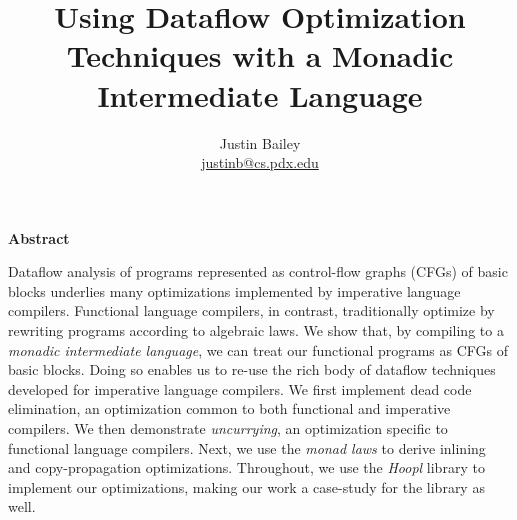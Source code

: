 \documentclass[12pt]{report}
\begin{document}


\newcommand{\authorEmail}{\url{justinb@cs.pdx.edu}}

\date{}
\author{Justin Bailey \\ \authorEmail}
\title{Using Dataflow Optimization Techniques with a Monadic Intermediate Language}
\maketitle 
\thispagestyle{empty}
\newpage
{}
\thispagestyle{plain}


\begin{center}
  \newlength{\abstractLen}
  \begin{minipage}{\abstractLen}
    \begin{center}
      {\sffamily\bfseries Abstract}
    \end{center}
    \bigskip
    \noindent
    Dataflow analysis of programs represented as control-flow graphs
    (CFGs) of basic blocks underlies many optimizations implemented by
    imperative language compilers. Functional language compilers, in
    contrast, traditionally optimize by rewriting programs according to
    algebraic laws. We show that, by compiling to a \emph{monadic
      intermediate language}, we can treat our functional programs as
    CFGs of basic blocks. Doing so enables us to re-use the rich body of
    dataflow techniques developed for imperative language compilers. We
    first implement dead code elimination, an optimization common to
    both functional and imperative compilers. We then demonstrate
    \emph{uncurrying}, an optimization specific to functional language
    compilers. Next, we use the \emph{monad laws} to derive inlining and
    copy-propagation optimizations. %
    Throughout, we use the
    \emph{Hoopl} library to implement our optimizations, making our work
    a case-study for the library as well.
  \end{minipage}
\end{center}

\end{document}
